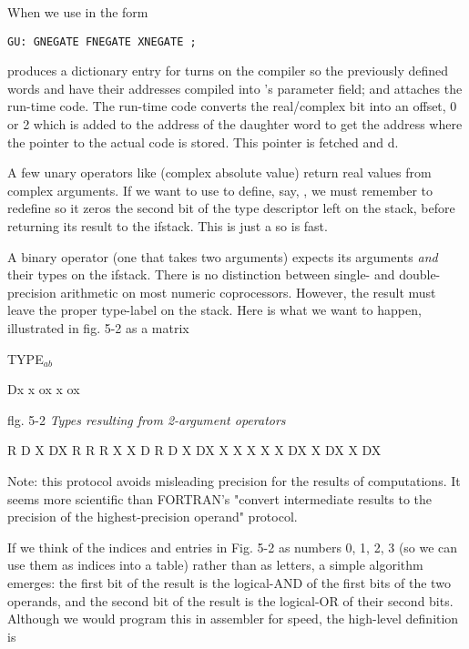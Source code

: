 When we use  in the form
\begin{lstlisting}
GU: GNEGATE FNEGATE XNEGATE ;
\end{lstlisting}

 produces a dictionary entry for \bc{GNEGATE; ]} turns on the compiler so the previously defined words  and  have their addresses compiled into 's parameter field; and  attaches the run-time code. The run-time code converts the real/complex bit into an offset, 0 or 2 which is added to the address of the daughter word to get the address where the pointer to the actual code is stored. This pointer is fetched and d.

A few unary operators like  (complex absolute value) return real values from complex arguments. If we want to use  to define, say, , we must remember to redefine  so it zeros the second bit of the type descriptor left on the stack, before returning its result to the ifstack. This is just a  so is fast.

A binary operator (one that takes two arguments) expects its arguments \textit{and} their types on the ifstack. There is no distinction between single- and double-precision arithmetic on most numeric coprocessors. However, the result must leave the proper type-label on the stack. Here is what we want to happen, illustrated in fig. 5-2 as a matrix 

TYPE$_{ab}$

Dx  x ox x ox

flg. 5-2 \textit{Types resulting from 2-argument operators}

   R D  X DX
R  R R  X X
D  R D  X DX
X  X X  X X
DX X DX X DX 

\leftbar[1\linewidth]
Note: this protocol avoids misleading precision for the results of computations. It seems more scientific than FORTRAN's "convert intermediate results to the precision of the highest-precision operand" protocol.
\endleftbar

If we think of the indices and entries in Fig. 5-2 as numbers 0, 1, 2, 3 (so we can use them as indices into a table) rather than as letters, a simple algorithm emerges: the first bit of the result is the logical-AND of the first bits of the two operands, and the second bit of the result is the logical-OR of their second bits. Although we would program this in assembler for speed, the high-level definition is

